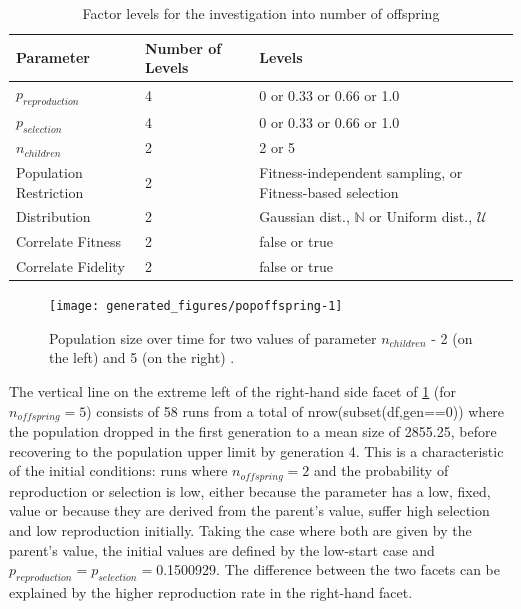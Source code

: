 \begin{table} %
	\begin{center}
		\caption{Factor levels for the investigation into number of offspring}
		\begin{tabular}{@{}llp{6cm}@{}}
			\toprule
			Parameter              & Number of Levels & Levels                                                       \\
			\midrule
			$p_{reproduction}$     & 4                & 0 or 0.33 or 0.66 or 1.0                                     \\
			$p_{selection}$        & 4                & 0 or 0.33 or 0.66 or 1.0                                     \\
			$n_{children}$         & 2                & 2 or 5                                                       \\
			Population Restriction & 2                & Fitness-independent sampling, or Fitness-based selection     \\
			Distribution           & 2                & Gaussian dist., $\mathbb{N}$ or Uniform dist., $\mathcal{U}$ \\
			Correlate Fitness      & 2                & false or true                                                \\
			Correlate Fidelity     & 2                & false or true                                                \\
			\bottomrule
		\end{tabular}
	\end{center}
\end{table}

\begin{knitrout}
\color{fgcolor}\begin{figure}[htp]
\texttt{[image: generated\_figures/popoffspring-1]} \caption[Population size over time for two values of parameter ]{Population size over time for two values of parameter $n_{children}$ - 2 (on the left) and 5 (on the right) .}\label{fig:popoffspring}
\end{figure}


\end{knitrout}

The vertical line on the extreme left of the right-hand side facet of \cref{fig:popoffspring} (for $n_{offspring} = 5$) consists of 58 runs from a total of nrow(subset(df,gen==0)) where the population dropped in the first generation to a mean size of 2855.25, before recovering to the population upper limit by generation 4. This is a characteristic of the initial conditions: runs where $n_{offspring} = 2$ and the probability of reproduction or selection is low, either because the parameter has a low, fixed, value or because they are derived from the parent's value, suffer high selection and low reproduction initially. Taking the case where both are given by the parent's value,  the initial values are defined by the low-start case and $p_{reproduction} = p_{selection} = $0.1500929. The difference between the two facets can be explained by the higher reproduction rate in the right-hand facet.

